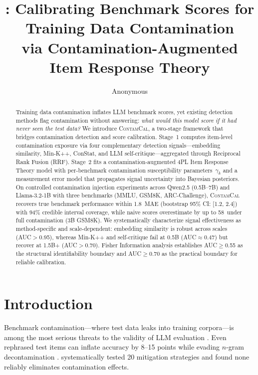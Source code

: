 \documentclass[11pt,a4paper]{article}
\title{\contamcal{}: Calibrating Benchmark Scores for Training Data Contamination\\via Contamination-Augmented Item Response Theory}
\author{Anonymous}
\newcommand{\contamcal}{\textsc{ContamCal}}
\newcommand{\pp}{\,\text{pp}}
\begin{document}
\maketitle

\begin{abstract}
Training data contamination inflates LLM benchmark scores, yet existing detection methods flag contamination without answering: \emph{what would this model score if it had never seen the test data?}
We introduce \contamcal{}, a two-stage framework that bridges contamination detection and score calibration.
Stage~1 computes item-level contamination exposure via four complementary detection signals---embedding similarity, Min-K++, ConStat, and LLM self-critique---aggregated through Reciprocal Rank Fusion (RRF).
Stage~2 fits a contamination-augmented 4PL Item Response Theory model with per-benchmark contamination susceptibility parameters~$\gamma_k$ and a measurement error model that propagates signal uncertainty into Bayesian posteriors.
On controlled contamination injection experiments across Qwen2.5 (0.5B--7B) and Llama-3.2-1B with three benchmarks (MMLU, GSM8K, ARC-Challenge), \contamcal{} recovers true benchmark performance within 1.8\pp{} MAE (bootstrap 95\% CI: [1.2, 2.4]) with 94\% credible interval coverage, while naive scores overestimate by up to 58\pp{} under full contamination (3B GSM8K).
We systematically characterize signal effectiveness as method-specific and scale-dependent: embedding similarity is robust across scales (AUC$>$0.95), whereas Min-K++ and self-critique fail at 0.5B (AUC$\approx$0.47) but recover at 1.5B+ (AUC$>$0.70).
Fisher Information analysis establishes AUC$\geq$0.55 as the structural identifiability boundary and AUC$\geq$0.70 as the practical boundary for reliable calibration.
\end{abstract}

\section{Introduction}
\label{sec:intro}

Benchmark contamination---where test data leaks into training corpora---is among the most serious threats to the validity of LLM evaluation \citep{sainz2023contamination,balloccu2024leak,li2024task}.
Even rephrased test items can inflate accuracy by 8--15 points while evading $n$-gram decontamination \citep{yang2023rethinking,dekoninck2024evading}.
\citet{xu2024benchmark} systematically tested 20 mitigation strategies and found none reliably eliminates contamination effects.
\end{document}
